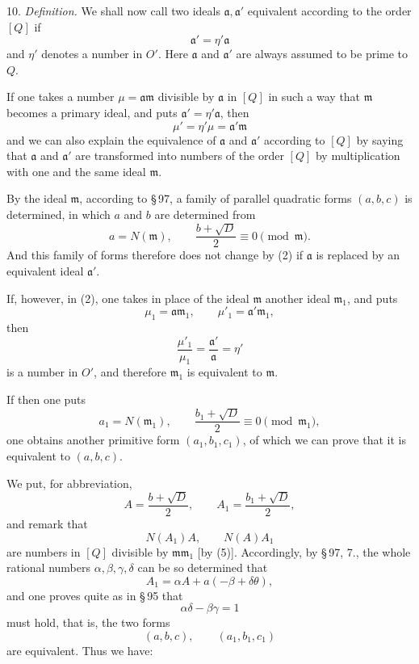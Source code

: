 \documentclass[11pt]{article}
\begin{document}
10. \emph{Definition.} We shall now call two ideals $\mathfrak a,\mathfrak a'$ equivalent according to the order $[Q]$ if
\begin{equation}
 \mathfrak a'=\eta'\mathfrak a
\tag{1}
\end{equation}
and $\eta'$ denotes a number in $O'$. Here $\mathfrak a$ and $\mathfrak a'$ are always assumed to be prime to $Q$.

If one takes a number $\mu=\mathfrak a\mathfrak m$ divisible by $\mathfrak a$ in $[Q]$ in such a way that $\mathfrak m$ becomes a primary ideal, and puts $\mathfrak a'=\eta'\mathfrak a$, then
\begin{equation}
 \mu'=\eta'\mu=\mathfrak a'\mathfrak m
\tag{2}
\end{equation}
and we can also explain the equivalence of $\mathfrak a$ and $\mathfrak a'$ according to $[Q]$ by saying that $\mathfrak a$ and $\mathfrak a'$ are transformed into numbers of the order $[Q]$ by multiplication with one and the same ideal $\mathfrak m$.

By the ideal $\mathfrak m$, according to \S\,97, a family of parallel quadratic forms $(a,b,c)$ is determined, in which $a$ and $b$ are determined from
\begin{equation}
 a=N(\mathfrak m),\qquad
 \frac{b+\sqrt D}{2}\equiv0\pmod{\mathfrak m}.
\tag{3}
\end{equation}
And this family of forms therefore does not change by (2) if $\mathfrak a$ is replaced by an equivalent ideal $\mathfrak a'$.

If, however, in (2), one takes in place of the ideal $\mathfrak m$ another ideal $\mathfrak m_1$, and puts
\begin{equation}
 \mu_1=\mathfrak a\mathfrak m_1,\qquad
 \mu'_1=\mathfrak a'\mathfrak m_1,
\tag{4}
\end{equation}
then
\[
 \frac{\mu'_1}{\mu_1}=\frac{\mathfrak a'}{\mathfrak a}=\eta'
\]
is a number in $O'$, and therefore $\mathfrak m_1$ is equivalent to $\mathfrak m$.

If then one puts
\begin{equation}
 a_1=N(\mathfrak m_1),\qquad
 \frac{b_1+\sqrt D}{2}\equiv0\pmod{\mathfrak m_1},
\tag{5}
\end{equation}
one obtains another primitive form $(a_1,b_1,c_1)$, of which we can prove that it is equivalent to $(a,b,c)$.

We put, for abbreviation,
\[
 A=\frac{b+\sqrt D}{2},\qquad
 A_1=\frac{b_1+\sqrt D}{2},
\]
and remark that
\[
 N(A_1)A,\qquad N(A)A_1
\]
are numbers in $[Q]$ divisible by $\mathfrak m\mathfrak m_1$ [by (5)]. Accordingly, by \S\,97, 7., the whole rational numbers $\alpha,\beta,\gamma,\delta$ can be so determined that
\begin{equation}
 A_1=\alpha A+a(-\beta+\delta\theta),
\tag{6}
\end{equation}
and one proves quite as in \S\,95 that
\[
 \alpha\delta-\beta\gamma=1
\]
must hold, that is, the two forms
\[
 (a,b,c),\qquad (a_1,b_1,c_1)
\]
are equivalent. Thus we have:
\end{document}
